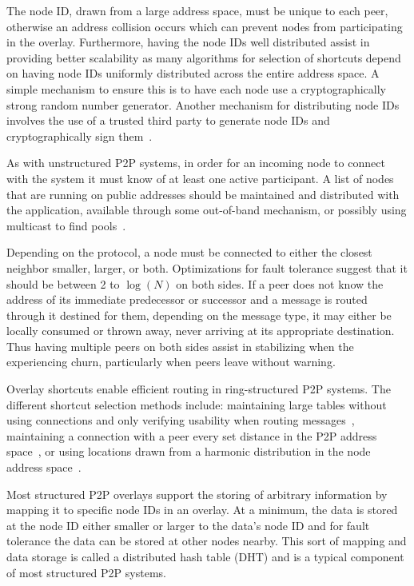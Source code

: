 \documentclass[conference]{IEEEtran}
\begin{document}
The node ID, drawn from a large address space, must be unique to each peer,
otherwise an address collision occurs which can prevent nodes from participating
in the overlay.  Furthermore, having the node IDs well distributed assist in
providing better scalability as many algorithms for selection of shortcuts
depend on having node IDs uniformly distributed across the entire address space.
A simple mechanism to ensure this is to have each node use a cryptographically
strong random number generator.  Another mechanism for distributing node IDs
involves the use of a trusted third party to generate node IDs and
cryptographically sign them~\cite{secure_routing}.

As with unstructured P2P systems, in order for an incoming node to connect with
the system it must know of at least one active participant.  A list of nodes
that are running on public addresses should be maintained and distributed with
the application, available through some out-of-band mechanism, or possibly using
multicast to find pools~\cite{pastry}.

Depending on the protocol, a node must be connected to either the closest
neighbor smaller, larger, or both.  Optimizations for fault tolerance suggest
that it should be between 2 to $\log(N)$ on both sides.  If a peer does not
know the address of its immediate predecessor or successor and a message
is routed through it destined for them, depending on the message type, it may
either be locally consumed or thrown away, never arriving at its appropriate
destination.  Thus having multiple peers on both sides assist in stabilizing
when the experiencing churn, particularly when peers leave without warning.

Overlay shortcuts enable efficient routing in ring-structured P2P systems.  The
different shortcut selection methods include: maintaining large tables without
using connections and only verifying usability when routing
messages~\cite{pastry, kademlia}, maintaining a connection with a peer every
set distance in the P2P address space~\cite{chord}, or using locations drawn
from a harmonic distribution in the node address space~\cite{symphony}.

Most structured P2P overlays support the storing of arbitrary information by
mapping it to specific node IDs in an overlay.  At a minimum, the data is stored
at the node ID either smaller or larger to the data's node ID and for fault
tolerance the data can be stored at other nodes nearby.  This sort of mapping
and data storage is called a distributed hash table (DHT) and is a typical
component of most structured P2P systems.
\end{document}
